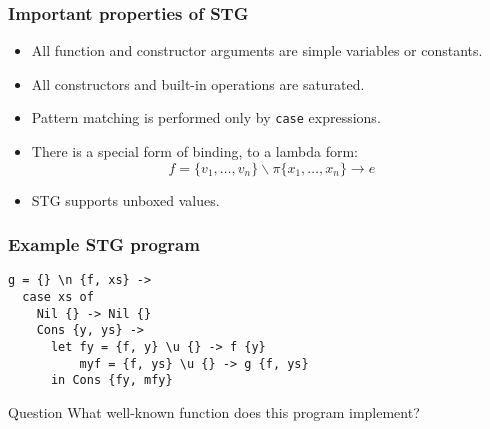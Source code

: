 \documentclass{beamer}
\begin{document}
\begin{frame}
    \frametitle{Important properties of STG}

    \begin{itemize}
        \item
            All function and constructor arguments are \alert{simple variables}
            or \alert{constants}.
        \item All constructors and built-in operations are \alert{saturated}.
        \item Pattern matching is performed only by \texttt{case} expressions.
        \item There is a special form of binding, to a \alert{lambda form}:
            \begin{equation*}
                f = \{ v_1, \ldots, v_n \}
                \backslash \pi
                \{ x_1, \ldots, x_n \}
                \to
                e
            \end{equation*}
        \item STG supports \alert{unboxed values}.
    \end{itemize}
\end{frame}

\begin{frame}[fragile]
    \frametitle{Example STG program}

    \begin{lstlisting}
g = {} \n {f, xs} ->
  case xs of
    Nil {} -> Nil {}
    Cons {y, ys} ->
      let fy = {f, y} \u {} -> f {y}
          myf = {f, ys} \u {} -> g {f, ys}
      in Cons {fy, mfy}
    \end{lstlisting}

    \begin{block}{Question}
        What well-known function does this program implement?
    \end{block}
\end{frame}
\end{document}
